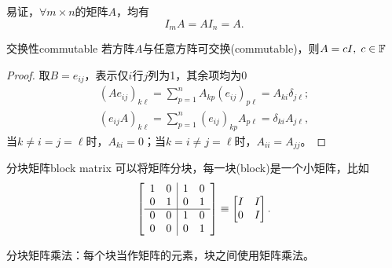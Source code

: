 易证，$\forall m\times n$的矩阵$A$，均有
\[
	I_mA=AI_n=A.
\]
\begin{theorem}{交换性}{commutable}
	若方阵$A$与任意方阵可交换(commutable)，则$A=cI,\;c\in\mathbb F$
\end{theorem}
\begin{proof}
	取$B=e_{ij}$，表示仅$i$行$j$列为1，其余项均为0
	\begin{align*}
		(Ae_{ij})_{k\ell}=\sum_{p=1}^nA_{kp}(e_{ij})_{p\ell}=A_{ki}\delta_{j\ell};\\
		(e_{ij}A)_{k\ell}=\sum_{p=1}^n(e_{ij})_{kp}A_{p\ell}=\delta_{ki}A_{j\ell},
	\end{align*}
	当$k\neq i=j=\ell$时，$A_{ki}=0$；当$k=i\neq j=\ell$时，$A_{ii}=A_{jj}$。
\end{proof}
\begin{definition}{分块矩阵}{block matrix}
	可以将矩阵分块，每一块(block)是一个小矩阵，比如
	\begin{align*}
		\left[\begin{array}{cc|cc}
			1&0&1&0\\
			0&1&0&1\\
			\hline
			0&0&1&0\\
			0&0&0&1	
		\end{array}\right]\equiv\begin{bmatrix}
			I&I\\0&I
		\end{bmatrix}.
	\end{align*}
\end{definition}
分块矩阵乘法：每个块当作矩阵的元素，块之间使用矩阵乘法。
